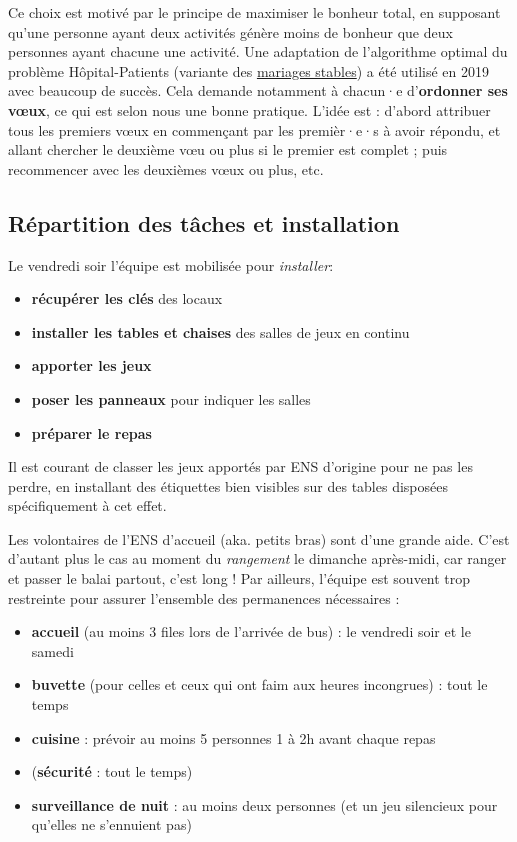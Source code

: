 Ce choix est motivé par le principe de maximiser le bonheur total, en supposant qu'une personne ayant deux activités génère moins de bonheur que deux personnes ayant chacune une activité. Une adaptation de l'algorithme optimal du problème Hôpital-Patients (variante des \href{https://fr.wikipedia.org/wiki/Problème_des_mariages_stables}{mariages stables}) a été utilisé en 2019 avec beaucoup de succès. Cela demande notamment à chacun·e d'\textbf{ordonner ses vœux}, ce qui est selon nous une bonne pratique. L'idée est : d'abord attribuer tous les premiers vœux en commençant par les premièr·e·s à avoir répondu, et allant chercher le deuxième vœu ou plus si le premier est complet ; puis recommencer avec les deuxièmes vœux ou plus, etc.


\subsection{Répartition des tâches et installation}

Le vendredi soir l'équipe est mobilisée pour \emph{installer}:
\begin{itemize}
    \item \textbf{récupérer les clés} des locaux
    \item \textbf{installer les tables et chaises} des salles de jeux en continu
    \item \textbf{apporter les jeux}
    \item \textbf{poser les panneaux} pour indiquer les salles
    \item \textbf{préparer le repas}
\end{itemize}

Il est courant de classer les jeux apportés par ENS d'origine pour ne pas les perdre, en installant des étiquettes bien visibles sur des tables disposées spécifiquement à cet effet.

Les volontaires de l'ENS d'accueil (aka. petits bras) sont d'une grande aide. C'est d'autant plus le cas au moment du \emph{rangement} le dimanche après-midi, car ranger et passer le balai partout, c'est long ! Par ailleurs, l'équipe est souvent trop restreinte pour assurer l'ensemble des permanences nécessaires :
\begin{itemize}
    \item \textbf{accueil} (au moins 3 files lors de l'arrivée de bus) : le vendredi soir et le samedi
    \item \textbf{buvette} (pour celles et ceux qui ont faim aux heures incongrues) : tout le temps
    \item \textbf{cuisine} : prévoir au moins 5 personnes 1 à 2h avant chaque repas
    \item (\textbf{sécurité} : tout le temps)
    \item \textbf{surveillance de nuit} : au moins deux personnes (et un jeu silencieux pour qu'elles ne s'ennuient pas)
\end{itemize}

